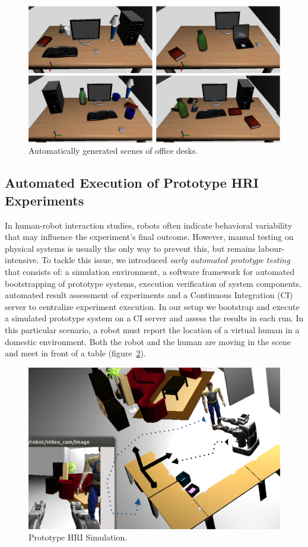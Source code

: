 \documentclass[letterpaper, 10pt, conference]{ieeeconf}
\begin{document}
\begin{figure}[tb]
  \centering
  \includegraphics[width=.9\columnwidth]{figs/scenes.png}
  \caption{Automatically generated scenes of office desks.}
  \label{fig:simulated-desktop-scenes}
\end{figure}


\subsection{Automated Execution of Prototype HRI Experiments}
\label{sc:ci}

In human-robot interaction studies, robots often indicate behavioral variability
that may influence the experiment's final outcome.  However, manual testing on
physical systems is usually the only way to prevent this, but remains
labour-intensive. To tackle this issue, we introduced \emph{early automated
prototype testing}~\cite{2645922} that consists of: a simulation environment, a
software framework for automated bootstrapping of prototype systems, execution
verification of system components, automated result assessment of experiments
and a Continuous Integration (CI) server to centralize experiment execution. In
our setup we bootstrap and execute a simulated prototype system on a CI server
and assess the results in each run. In this particular scenario, a robot must
report the location of a virtual human in a domestic environment. Both the
robot and the human are moving in the scene and meet in front of a table
(figure~\ref{fig|proto}).

\begin{figure}[H]
      \centering
      \includegraphics[width=0.9\linewidth]{proto-setup.png}
      \caption{Prototype HRI Simulation.}
      \label{fig|proto}
\end{figure}
\end{document}
